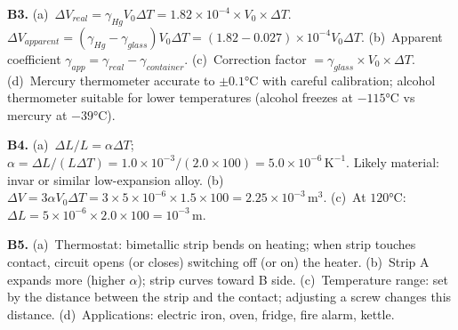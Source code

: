 \textbf{B3.}
(a)~$\Delta V_{real}=\gamma_{Hg}V_0\Delta T
=1.82\times10^{-4}\times V_0\times\Delta T$.
$\Delta V_{apparent}=(\gamma_{Hg}-\gamma_{glass})
V_0\Delta T
=(1.82-0.027)\times10^{-4}V_0\Delta T$. \quad
(b)~Apparent coefficient $\gamma_{app}
=\gamma_{real}-\gamma_{container}$. \quad
(c)~Correction factor $=\gamma_{glass}\times V_0\times\Delta T$. \quad
(d)~Mercury thermometer accurate to $\pm0.1°\text{C}$ with
careful calibration; alcohol thermometer suitable for
lower temperatures (alcohol freezes at $-115°\text{C}$
vs mercury at $-39°\text{C}$).

\textbf{B4.}
(a)~$\Delta L/L=\alpha\Delta T$;
$\alpha=\Delta L/(L\Delta T)
=1.0\times10^{-3}/(2.0\times100)
=5.0\times10^{-6}\,\text{K}^{-1}$.
Likely material: invar or similar low-expansion alloy. \quad
(b)~$\Delta V=3\alpha V_0\Delta T
=3\times5\times10^{-6}\times1.5\times100
=2.25\times10^{-3}\,\text{m}^3$. \quad
(c)~At $120°\text{C}$: $\Delta L=5\times10^{-6}
\times2.0\times100=10^{-3}\,\text{m}$.

\textbf{B5.}
(a)~Thermostat: bimetallic strip bends on heating;
when strip touches contact, circuit opens (or closes)
switching off (or on) the heater. \quad
(b)~Strip A expands more (higher $\alpha$); strip curves
toward B side. \quad
(c)~Temperature range: set by the distance between the
strip and the contact; adjusting a screw changes this
distance. \quad
(d)~Applications: electric iron, oven, fridge, fire
alarm, kettle.

\endgroup


